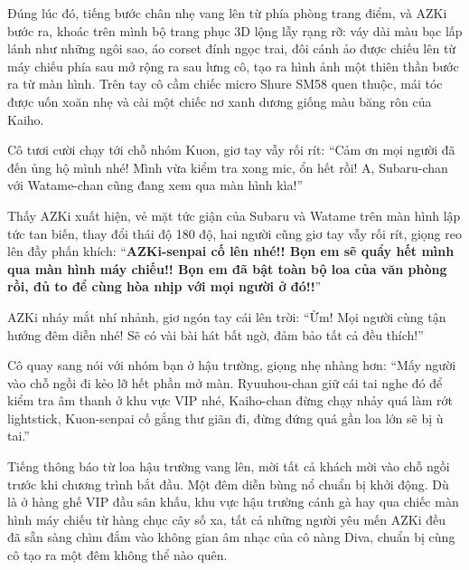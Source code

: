 \documentclass[../main.tex]{subfiles}
\begin{document}
Đúng lúc đó, tiếng bước chân nhẹ vang lên từ phía phòng trang điểm, và AZKi bước ra, khoác trên mình bộ trang phục 3D lộng lẫy rạng rỡ: váy dài màu bạc lấp lánh như những ngôi sao, áo corset đính ngọc trai, đôi cánh ảo được chiếu lên từ máy chiếu phía sau mở rộng ra sau lưng cô, tạo ra hình ảnh một thiên thần bước ra từ màn hình. Trên tay cô cầm chiếc micro Shure SM58 quen thuộc, mái tóc được uốn xoăn nhẹ và cài một chiếc nơ xanh dương giống màu băng rôn của Kaiho.

Cô tươi cười chạy tới chỗ nhóm Kuon, giơ tay vẫy rối rít: ``Cảm ơn mọi người đã đến ủng hộ mình nhé! Mình vừa kiểm tra xong mic, ổn hết rồi! A, Subaru-chan với Watame-chan cũng đang xem qua màn hình kìa!''

Thấy AZKi xuất hiện, vẻ mặt tức giận của Subaru và Watame trên màn hình lập tức tan biến, thay đổi thái độ 180 độ, hai người cũng giơ tay vẫy rối rít, giọng reo lên đầy phấn khích: ``\textbf{AZKi-senpai cố lên nhé!! Bọn em sẽ quẩy hết mình qua màn hình máy chiếu!! Bọn em đã bật toàn bộ loa của văn phòng rồi, đủ to để cùng hòa nhịp với mọi người ở đó!!}''

AZKi nháy mắt nhí nhảnh, giơ ngón tay cái lên trời: ``Ừm! Mọi người cùng tận hưởng đêm diễn nhé! Sẽ có vài bài hát bất ngờ, đảm bảo tất cả đều thích!''

Cô quay sang nói với nhóm bạn ở hậu trường, giọng nhẹ nhàng hơn: ``Mấy người vào chỗ ngồi đi kẻo lỡ hết phần mở màn. Ryuuhou-chan giữ cái tai nghe đó để kiểm tra âm thanh ở khu vực VIP nhé, Kaiho-chan đừng chạy nhảy quá làm rớt lightstick, Kuon-senpai cố gắng thư giãn đi, đừng đứng quá gần loa lớn sẽ bị ù tai.''

Tiếng thông báo từ loa hậu trường vang lên, mời tất cả khách mời vào chỗ ngồi trước khi chương trình bắt đầu. Một đêm diễn bùng nổ chuẩn bị khởi động. Dù là ở hàng ghế VIP đầu sân khấu, khu vực hậu trường cánh gà hay qua chiếc màn hình máy chiếu từ hàng chục cây số xa, tất cả những người yêu mến AZKi đều đã sẵn sàng chìm đắm vào không gian âm nhạc của cô nàng Diva, chuẩn bị cùng cô tạo ra một đêm không thể nào quên.
\end{document}
